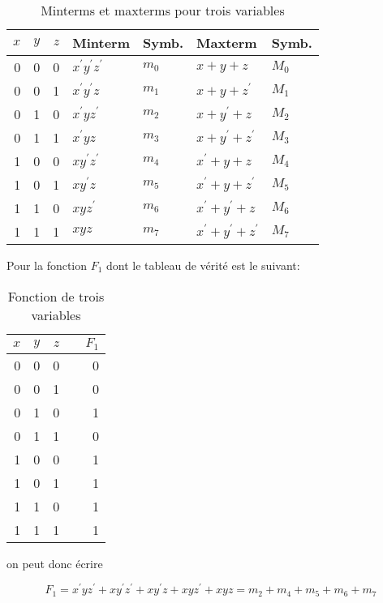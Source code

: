 \documentclass[letter, oneside]{book}
\begin{document}
\begin{enumerate}
\begin{table}[htbp]
\caption{\label{tab:org3f3884a}Minterms et maxterms pour trois variables}
\centering
\begin{tabular}{rrrllll}
\(x\) & \(y\) & \(z\) & Minterm & Symb. & Maxterm & Symb.\\[0pt]
\hline
0 & 0 & 0 & \(x^\prime y^\prime z^\prime\) & \(m_0\) & \(x+ y+ z\) & \(M_0\)\\[0pt]
0 & 0 & 1 & \(x^\prime y^\prime z\) & \(m_1\) & \(x+ y+ z^\prime\) & \(M_1\)\\[0pt]
0 & 1 & 0 & \(x^\prime y z^\prime\) & \(m_2\) & \(x+ y^\prime+ z\) & \(M_2\)\\[0pt]
0 & 1 & 1 & \(x^\prime y z\) & \(m_3\) & \(x+ y^\prime+ z^\prime\) & \(M_3\)\\[0pt]
1 & 0 & 0 & \(x y^\prime z^\prime\) & \(m_4\) & \(x^\prime+ y+ z\) & \(M_4\)\\[0pt]
1 & 0 & 1 & \(x y^\prime z\) & \(m_5\) & \(x^\prime+ y+ z^\prime\) & \(M_5\)\\[0pt]
1 & 1 & 0 & \(x y z^\prime\) & \(m_6\) & \(x^\prime+ y^\prime+ z\) & \(M_6\)\\[0pt]
1 & 1 & 1 & \(x y z\) & \(m_7\) & \(x^\prime + y^\prime+ z^\prime\) & \(M_7\)\\[0pt]
\end{tabular}
\end{table}

Pour la fonction \(F_1\) dont le tableau de vérité est le suivant: 

\begin{table}[htbp]
\caption{\label{tab:org87964d4}Fonction de trois variables}
\centering
\begin{tabular}{rrrlr}
\(x\) & \(y\) & \(z\) &  & \(F_1\)\\[0pt]
\hline
0 & 0 & 0 &  & 0\\[0pt]
0 & 0 & 1 &  & 0\\[0pt]
0 & 1 & 0 &  & 1\\[0pt]
0 & 1 & 1 &  & 0\\[0pt]
1 & 0 & 0 &  & 1\\[0pt]
1 & 0 & 1 &  & 1\\[0pt]
1 & 1 & 0 &  & 1\\[0pt]
1 & 1 & 1 &  & 1\\[0pt]
\end{tabular}
\end{table}

on peut donc écrire

$$F_1 = x^\prime y
z^\prime + x y^\prime z^\prime + x y^\prime z + x y z^\prime + x y z =
m_2 + m_4 + m_5 + m_6 + m_7$$


\end{enumerate}
\end{document}

